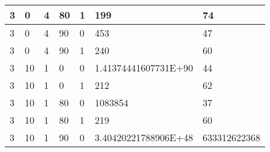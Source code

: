 \documentclass{article}
\theoremstyle{definition}
\begin{document}
\begin{table}[]
\begin{tabular}{|l|l|l|l|l|l|l|}
3                                      & 0                                       & 4                                      & 80                                   & 1                                      & 199                                      & 74                                     \\ \hline
3                                      & 0                                       & 4                                      & 90                                   & 0                                      & 453                                      & 47                                     \\ \hline
3                                      & 0                                       & 4                                      & 90                                   & 1                                      & 240                                      & 60                                     \\ \hline
3                                      & 10                                      & 1                                      & 0                                    & 0                                      & 1.41374441607731E+90                     & 44                                     \\ \hline
3                                      & 10                                      & 1                                      & 0                                    & 1                                      & 212                                      & 62                                     \\ \hline
3                                      & 10                                      & 1                                      & 80                                   & 0                                      & 1083854                                  & 37                                     \\ \hline
3                                      & 10                                      & 1                                      & 80                                   & 1                                      & 219                                      & 60                                     \\ \hline
3                                      & 10                                      & 1                                      & 90                                   & 0                                      & 3.40420221788906E+48                     & 633312622368                           \\ \hline

\end{tabular}
\end{table}
\end{document}
